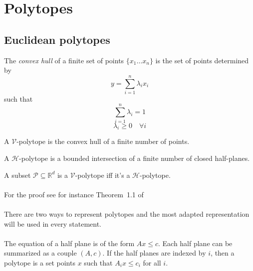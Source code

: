\section{Polytopes}

\subsection{Euclidean polytopes}
\begin{definition}
  The \textit{convex hull} of a finite set of points $\{x_1 \dots x_n\}$ is the set of points determined by
  \[
    y = \sum_{i=1}^n \lambda_i x_i
  \]
  such that
  \[
    \sum_{i=1}^n \lambda_i = 1
  \]
  \[
    \lambda_i \ge 0 \quad \forall i
  \]
\end{definition}

\begin{definition}
  A $\mathcal V$-polytope is the convex hull of a finite number of points.
\end{definition}

\begin{definition}
  A $\mathcal H$-polytope is a bounded intersection of a finite number of closed half-planes.
\end{definition}

\begin{theorem}
  A subset $\mathcal P \subseteq \mathbb R^d$ is a $\mathcal V$-polytope iff it's a $\mathcal H$-polytope.
\end{theorem}

\paragraph{}
For the proof see for instance Theorem~1.1 of~\cite{polytopes}

\paragraph{}
There are two ways to represent polytopes and the most adapted representation will be used in every statement.

\paragraph{}
The equation of a half plane is of the form $Ax \le c$. Each half plane can be summarized as a couple $(A,c)$. If the half planes are indexed by $i$, then a polytope is a set points $x$ such that $A_i x \le c_i$ for all $i$.


